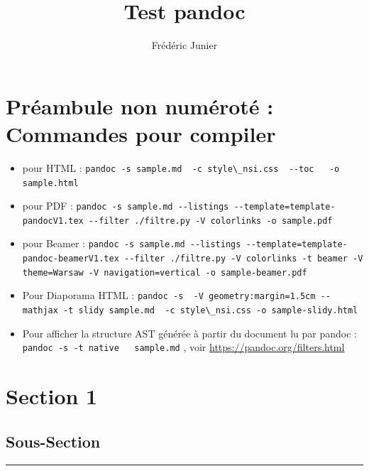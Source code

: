 \documentclass[
  11pt,
]{article}
\title{Test pandoc}
\author{Frédéric Junier}
\date{}
\newcommand{\passthrough}[1]{#1}
\begin{document}
\maketitle

\hypertarget{pruxe9ambule-non-numuxe9rotuxe9-commandes-pour-compiler}{%
\section*{Préambule non numéroté : Commandes pour
compiler}\label{pruxe9ambule-non-numuxe9rotuxe9-commandes-pour-compiler}}

\begin{itemize}
\item
  pour HTML :
  \passthrough{\lstinline!pandoc -s sample.md  -c style\_nsi.css  --toc   -o  sample.html!}
\item
  pour PDF :
  \passthrough{\lstinline!pandoc -s sample.md --listings --template=template-pandocV1.tex --filter ./filtre.py -V colorlinks -o sample.pdf!}
\item
  pour Beamer :
  \passthrough{\lstinline!pandoc -s sample.md --listings --template=template-pandoc-beamerV1.tex --filter ./filtre.py -V colorlinks -t beamer -V theme=Warsaw -V navigation=vertical -o sample-beamer.pdf!}
\item
  Pour Diaporama HTML :
  \passthrough{\lstinline!pandoc -s  -V geometry:margin=1.5cm --mathjax -t slidy sample.md  -c style\_nsi.css -o sample-slidy.html!}
\item
  Pour afficher la structure AST générée à partir du document lu par
  pandoc : \passthrough{\lstinline!pandoc -s -t native   sample.md!} ,
  voir \url{https://pandoc.org/filters.html}
\end{itemize}

\hypertarget{section-1}{%
\section{Section 1}\label{section-1}}

\hypertarget{sous-section}{%
\subsection{Sous-Section}\label{sous-section}}

\begin{center}\rule{0.5\linewidth}{0.5pt}\end{center}
\end{document}
